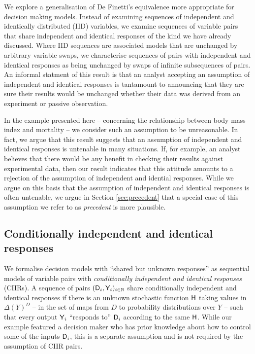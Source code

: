 We explore a generalisation of De Finetti's equivalence more appropriate for decision making models. Instead of examining sequences of independent and identically distributed (IID) variables, we examine sequences of variable pairs that share independent and identical responses of the kind we have already discussed. Where IID sequences are associated models that are unchanged by arbitrary variable swaps, we characterise sequences of pairs with independent and identical responses as being unchanged by swaps of infinite subsequences of pairs. An informal statment of this result is that an analyst accepting an assumption of independent and identical responses is tantamount to announcing that they are sure their results would be unchanged whether their data was derived from an experiment or passive observation.

In the example presented here -- concerning the relationship between body mass index and mortality -- we consider such an assumption to be unreasonable. In fact, we argue that this result suggests that an assumption of independent and identical responses is untenable in many situations. If, for example, an analyst believes that there would be any benefit in checking their results against experimental data, then our result indicates that this attitude amounts to a rejection of the assumption of independent and idential responses. While we argue on this basis that the assumption of independent and identical responses is often untenable, we argue in Section \ref{sec:precedent} that a special case of this assumption we refer to as \emph{precedent} is more plausible.

\subsection[Response functions]{Conditionally independent and identical responses}\label{sec:response_functions}

We formalise decision models with ``shared but unknown responses'' as sequential models of variable pairs with \emph{conditionally independent and identical responses} (CIIRs). A sequence of pairs $(\mathsf{D}_i,\mathsf{Y}_i)_{i\in \mathbb{N}}$ share conditionally independent and identical responses if there is an unknown stochastic function $\mathsf{H}$ taking values in $\Delta(Y)^D$ -- in the set of maps from $D$ to probability distributions over $Y$ -- such that every output $\mathsf{Y}_i$ ``responds to'' $\mathsf{D}_i$ according to the same $\mathsf{H}$. While our example featured a decision maker who has prior knowledge about how to control some of the inputs $\mathsf{D}_i$, this is a separate assumption and is not required by the assumption of CIIR pairs.

